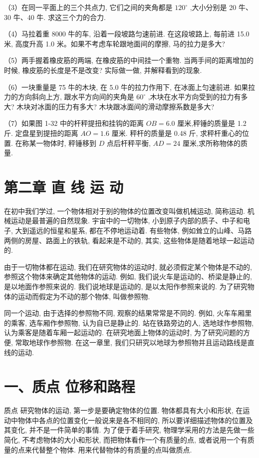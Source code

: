 \documentclass[10pt]{article}
\begin{document}
（3）在同一平面上的三个共点力, 它们之间的夹角都是 \({120}^{ \circ }\) ,大小分别是 20 牛、30 牛、40 牛. 求这三个力的合力.

（4）马拉着重 8000 牛的车, 沿着一段坡路匀速前进. 在这段坡路上, 每前进 15.0 米, 高度升高 1.0 米。如果不考虑车轮跟地面间的摩擦, 马的拉力是多大?

（5）两手握着橡皮筋的两端, 在橡皮筋的中间挂一个重物. 当两手间的距离增加的时候, 橡皮筋的长度是不是改变? 实际做一做, 并解释看到的现象.

（6）一块重量是 75 牛的木块, 在 5.0 牛的拉力作用下, 在冰面上匀速前进. 如果拉力的方向斜向上方, 跟水平方向间的夹角是 \({60}^{ \circ }\) ,木块在水平方向受到的拉力有多大? 木块对冰面的压力有多大? 木块跟冰面间的滑动摩擦系数是多大?

（7）如果图 1-32 中的杆秤提扭和挂钩的距离 \({OB} = {6.0}\) 厘米,秤锤的质量是 1.2 斤. 定盘星到提扭的距离 \({AO} = {1.6}\) 厘米. 秤杆的质量是 0.48 斤, 求秤杆重心的位置. 在称某一物体时, 秤锤移到 \(D\) 点后杆秤平衡, \({AD} = {24}\) 厘米,求所称物体的质量.

\section*{第二章 直 线 运 动}

在初中我们学过, 一个物体相对于别的物体的位置改变叫做机械运动, 简称运动. 机械运动是最普遍的自然现象. 宇宙中的一切物体, 小到原子内部的质子、中子和电子, 大到遥远的恒星和星系, 都在不停地运动着. 有些物体, 例如耸立的山峰、马路两侧的房屋、路面上的铁轨, 看起来是不动的, 其实, 这些物体是随着地球一起运动的.

由于一切物体都在运动, 我们在研究物体的运动时, 就必须假定某个物体是不动的, 参照这个物体来确定其他物体的运动. 例如, 我们说火车是运动的、桥梁是静止的, 是以地面作参照来说的. 我们说地球是运动的, 是以太阳作参照来说的. 为了研究物体的运动而假定为不动的那个物体, 叫做参照物.

同一个运动, 由于选择的参照物不同, 观察的结果常常是不同的. 例如, 火车车厢里的乘客, 选车厢作参照物, 认为自已是静止的. 站在铁路旁边的人, 选地球作参照物, 认为乘客是随着车厢一起运动的. 在研究地面上物体的运动时, 为了研究问题的方便, 常取地球作参照物. 在这一章里, 我们只研究以地球为参照物并且运动路线是直线的运动.

\section*{一、质点 位移和路程}

质点 研究物体的运动, 第一步是要确定物体的位置. 物体都具有大小和形状, 在运动中物体中各点的位置变化一般说来是各不相同的, 所以要详细描述物体的位置及其变化, 并不是一件简单的事情. 为了便于着手研究, 物理学采用的方法是先做一些简化, 不考虑物体的大小和形状, 而把物体看作一个有质量的点, 或者说用一个有质量的点来代替整个物体. 用来代替物体的有质量的点叫做质点.
\end{document}
